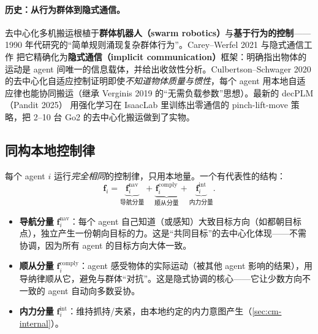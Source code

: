 \paragraph{历史：从行为群体到隐式通信。}
去中心化多机搬运根植于\textbf{群体机器人（swarm robotics）}与\textbf{基于行为的控制}——1990 年代研究的“简单规则涌现复杂群体行为”。Carey--Werfel 2021\cite{carey2021collective} 与隐式通信工作\cite{wang2018collaborative} 把它精确化为\textbf{隐式通信（implicit communication）}框架：明确指出物体的运动是 agent 间唯一的信息载体，并给出收敛性分析。Culbertson--Schwager 2020\cite{culbertson2021decentralized} 的去中心化自适应控制证明即使\emph{不知道物体质量与惯性}，每个 agent 用本地自适应律也能协同搬运（继承 Verginis 2019\cite{verginis2019cooperative} 的“无需负载参数”思想）。最新的 decPLM（Pandit 2025）\cite{pandit2025decplm} 用强化学习在 IsaacLab 里训练出零通信的 pinch-lift-move 策略，把 2--10 台 Go2 的去中心化搬运做到了实物。

\subsection{同构本地控制律}
\label{sec:cm-decentral-law}
每个 agent $i$ 运行\emph{完全相同}的控制律，只用本地量。一个有代表性的结构：
\begin{equation}
  \mathbf{f}_i=\underbrace{\mathbf{f}_i^{\text{nav}}}_{\text{导航分量}}
  +\underbrace{\mathbf{f}_i^{\text{comply}}}_{\text{顺从分量}}
  +\underbrace{\mathbf{f}_i^{\text{int}}}_{\text{内力分量}}.
  \label{eq:cm-decentral}
\end{equation}
\begin{itemize}
  \item \textbf{导航分量} $\mathbf{f}_i^{\text{nav}}$：每个 agent 自己知道（或感知）大致目标方向（如都朝目标点），独立产生一份朝向目标的力。这是“共同目标”的去中心化体现——不需协调，因为所有 agent 的目标方向大体一致。
  \item \textbf{顺从分量} $\mathbf{f}_i^{\text{comply}}$：agent 感受物体的实际运动（被其他 agent 影响的结果），用导纳律顺从它，避免与群体“对抗”。这是隐式协调的核心——它让少数方向不一致的 agent 自动向多数妥协。
  \item \textbf{内力分量} $\mathbf{f}_i^{\text{int}}$：维持抓持/夹紧，由本地约定的内力意图产生（\cref{sec:cm-internal}）。
\end{itemize}

